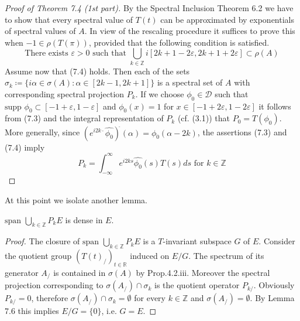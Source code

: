 \begin{proof}[Proof of Theorem 7.4 (1st part)]
	By the Spectral Inclusion Theorem 6.2 we have to show that every spectral value of $T(t)$ can be approximated by exponentials of spectral values of $A$.
	In view of the rescaling procedure it suffices to prove this when $-1 \in \rho(T(\pi))$, provided that the following condition is satisfied.
	\begin{equation}\label{eq:a3-7.4}
		\text{There exists } \varepsilon > 0 \text{ such that } \bigcup_{k\in\mathbb{Z}} i[2k+1-2\varepsilon,2k+1+2\varepsilon] \subset \rho(A)
	\end{equation}
	Assume now that (7.4) holds.
	Then each of the sets $\sigma_{k}\coloneqq \{i\alpha \in \sigma(A) \colon \alpha \in [2k-1,2k+1]\}$ is a spectral set of $A$ with corresponding spectral projection $P_{k}$.
	If we choose $\phi_{0} \in \mathcal{D}$ such that $\text{supp }\phi_{0} \subset [-1+\varepsilon,1-\varepsilon]$ and $\phi_{0}(x) = 1$ for $x \in [-1+2\varepsilon,1-2\varepsilon]$ it follows from (7.3) and the integral representation of $P_{k}$ (cf. (3.1)) that $P_{0} = T(\phi_{0})$.
	More generally, since $(e^{i2k\cdot}\hat{\phi_{0}})^{\check{}}(\alpha) = \phi_{0}(\alpha-2k)$, the assertions (7.3) and (7.4) imply
	\begin{equation}\label{eq:a3-7.5}
		P_{k} = \int_{-\infty}^{\infty} e^{i2ks}\hat{\phi_{0}}(s)T(s)ds \text{ for } k \in \mathbb{Z}
	\end{equation}
\end{proof}
	
	At this point we isolate another lemma.
	\begin{lemma}\label{lem:a3-7.7}
		$\text{span }\bigcup_{k\in\mathbb{Z}} P_{k}E$ is dense in $E$.
	\end{lemma}
	\begin{proof}
		The closure of $\text{span }\bigcup_{k\in\mathbb{Z}} P_{k}E$ is a $T$-invariant subspace $G$ of $E$.
		Consider the quotient group $(T(t)_/)_{t\in\mathbb{R}}$ induced on $E/G$.
		The spectrum of its generator $A_{/}$ is contained in $\sigma(A)$ by Prop.4.2.iii.
		Moreover the spectral projection corresponding to $\sigma(A_{/}) \cap \sigma_{k}$ is the quotient operator $P_{k/}$.
		Obviously $P_{k/} = 0$, therefore $\sigma(A_{/}) \cap \sigma_{k} = \emptyset$ for every $k \in \mathbb{Z}$ and $\sigma(A_{/}) = \emptyset$.
		By Lemma 7.6 this implies $E/G = \{0\}$, i.e. $G = E$.
	\end{proof}
	
